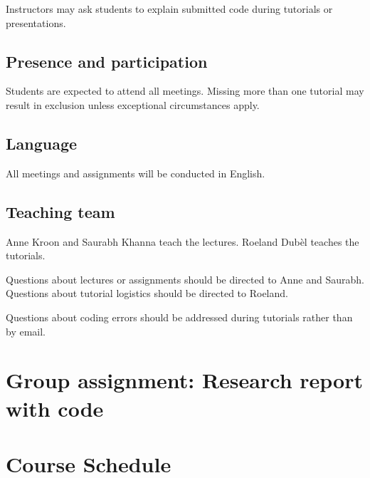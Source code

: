 \documentclass[a4paper,10pt]{report}
\begin{document}
Instructors may ask students to explain submitted code during tutorials or presentations.

\section{Presence and participation}

Students are expected to attend all meetings. Missing more than one tutorial may result in exclusion unless exceptional circumstances apply.

\section{Language}

All meetings and assignments will be conducted in English.

\section{Teaching team}

Anne Kroon and Saurabh Khanna teach the lectures. Roeland Dubèl teaches the tutorials.

Questions about lectures or assignments should be directed to Anne and Saurabh. Questions about tutorial logistics should be directed to Roeland.

Questions about coding errors should be addressed during tutorials rather than by email.

\chapter{Group assignment: Research report with code}
\label{sec:groupassignment}



\chapter{Course Schedule}





\end{document}

